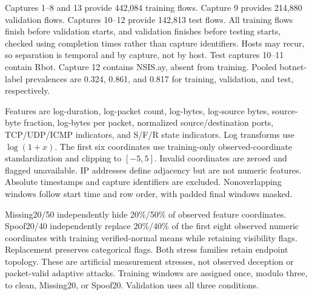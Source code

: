 \documentclass[11pt,letterpaper]{article}
\begin{document}
Captures 1–8 and 13 provide 442,084 training flows. Capture 9 provides 214,880 validation flows. Captures 10–12 provide 142,813 test flows. All training flows finish before validation starts, and validation finishes before testing starts, checked using completion times rather than capture identifiers. Hosts may recur, so separation is temporal and by capture, not by host. Test captures 10–11 contain Rbot. Capture 12 contains NSIS.ay, absent from training. Pooled botnet-label prevalences are 0.324, 0.861, and 0.817 for training, validation, and test, respectively.\par

Features are log-duration, log-packet count, log-bytes, log-source bytes, source-byte fraction, log-bytes per packet, normalized source/destination ports, TCP/UDP/ICMP indicators, and S/F/R state indicators. Log transforms use \(\log(1+x)\). The first six coordinates use training-only observed-coordinate standardization and clipping to \([-5,5]\). Invalid coordinates are zeroed and flagged unavailable. IP addresses define adjacency but are not numeric features. Absolute timestamps and capture identifiers are excluded. Nonoverlapping windows follow start time and row order, with padded final windows masked.\par

Missing20/50 independently hide 20\%/50\% of observed feature coordinates. Spoof20/40 independently replace 20\%/40\% of the first eight observed numeric coordinates with training verified-normal means while retaining visibility flags. Replacement preserves categorical flags. Both stress families retain endpoint topology. These are artificial measurement stresses, not observed deception or packet-valid adaptive attacks. Training windows are assigned once, modulo three, to clean, Missing20, or Spoof20. Validation uses all three conditions.\par
\end{document}
